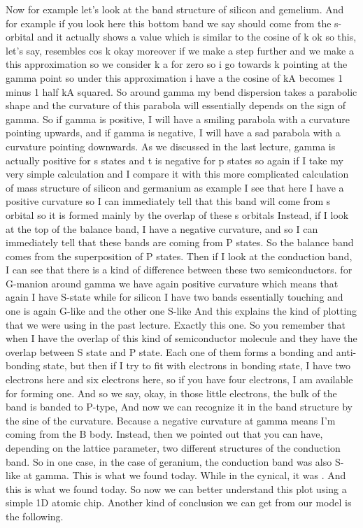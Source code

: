 Now for example let's look at the band structure of silicon and gemelium. And for example if you look here this bottom band we say should come from the s-orbital and it actually shows a value which is similar to the cosine of k ok so this, let's say, resembles cos k okay moreover if we make a step further and we make a this approximation so we consider k a for zero so i go towards k pointing at the gamma point so under this approximation i have a the cosine of kA becomes 1 minus 1 half kA squared. So around gamma my bend dispersion takes a parabolic shape and the curvature of this parabola will essentially depends on the sign of gamma. So if gamma is positive, I will have a smiling parabola with a curvature pointing upwards, and if gamma is negative, I will have a sad parabola with a curvature pointing downwards. As we discussed in the last lecture, gamma is actually positive for s states and t is negative for p states so again if I take my very simple calculation and I compare it with this more complicated calculation of mass structure of silicon and germanium as example I see that here I have a positive curvature so I can immediately tell that this band will come from s orbital so it is formed mainly by the overlap of these s orbitals Instead, if I look at the top of the balance band, I have a negative curvature, and so I can immediately tell that these bands are coming from P states. So the balance band comes from the superposition of P states. Then if I look at the conduction band, I can see that there is a kind of difference between these two semiconductors. for G-manion around gamma we have again positive curvature which means that again I have S-state while for silicon I have two bands essentially touching and one is again G-like and the other one S-like And this explains the kind of plotting that we were using in the past lecture. Exactly this one. So you remember that when I have the overlap of this kind of semiconductor molecule and they have the overlap between S state and P state. Each one of them forms a bonding and anti-bonding state, but then if I try to fit with electrons in bonding state, I have two electrons here and six electrons here, so if you have four electrons, I am available for forming one. And so we say, okay, in those little electrons, the bulk of the band is banded to P-type, And now we can recognize it in the band structure by the sine of the curvature. Because a negative curvature at gamma means I'm coming from the B body. Instead, then we pointed out that you can have, depending on the lattice parameter, two different structures of the conduction band. So in one case, in the case of geranium, the conduction band was also S-like at gamma. This is what we found today. While in the cynical, it was . And this is what we found today. So now we can better understand this plot using a simple 1D atomic chip. Another kind of conclusion we can get from our model is the following.
